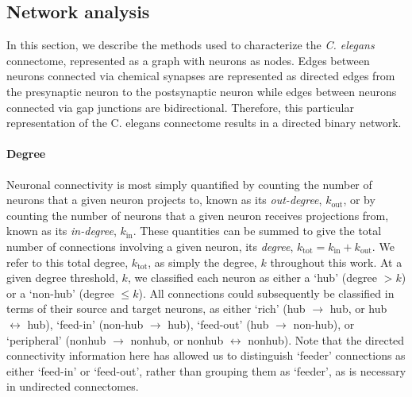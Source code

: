 \documentclass[10pt,letterpaper]{article}
\begin{document}
\subsection*{Network analysis}

In this section, we describe the methods used to characterize the \emph{C. elegans} connectome, represented as a graph with neurons as nodes.
Edges between neurons connected via chemical synapses are represented as directed edges from the presynaptic neuron to the postsynaptic neuron while edges between neurons connected via gap junctions are bidirectional.
Therefore, this particular representation of the C. elegans connectome results in a directed binary network.


\paragraph{Degree}
Neuronal connectivity is most simply quantified by counting the number of neurons that a given neuron projects to, known as its \emph{out-degree}, $k_\mathrm{out}$, or by counting the number of neurons that a given neuron receives projections from, known as its \emph{in-degree}, $k_\mathrm{in}$.
These quantities can be summed to give the total number of connections involving a given neuron, its \emph{degree}, $k_\mathrm{tot} = k_\mathrm{in} + k_\mathrm{out}$.
We refer to this total degree, $k_\mathrm{tot}$, as simply the degree, $k$ throughout this work.
At a given degree threshold, $k$, we classified each neuron as either a `hub' (degree $>k$) or a `non-hub' (degree $\leq k$).
All connections could subsequently be classified in terms of their source and target neurons, as either `rich' (hub $\rightarrow$ hub, or hub $\leftrightarrow$ hub), `feed-in' (non-hub $\rightarrow$ hub), `feed-out' (hub $\rightarrow$ non-hub), or `peripheral' (nonhub $\rightarrow$ nonhub, or nonhub $\leftrightarrow$ nonhub).
Note that the directed connectivity information here has allowed us to distinguish `feeder' connections as either `feed-in' or `feed-out', rather than grouping them as `feeder', as is necessary in undirected connectomes.
\end{document}
